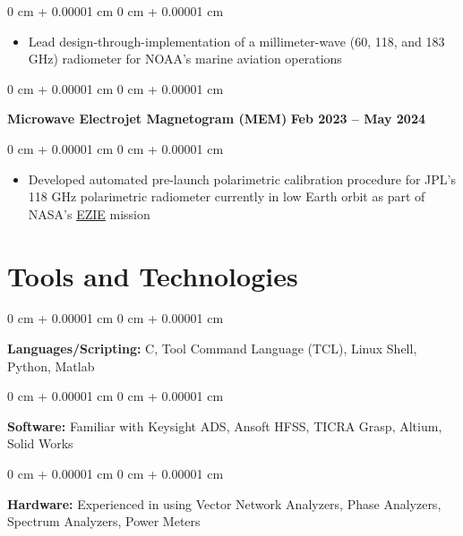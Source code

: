 \documentclass[10pt, letterpaper]{article}
\newenvironment{highlights}{
    \begin{itemize}[
        topsep=0.10 cm,
        parsep=0.10 cm,
        partopsep=0pt,
        itemsep=0pt,
        leftmargin=0 cm + 10pt     
    ]
}{
    \end{itemize}
} %
\newenvironment{onecolentry}{
    \begin{adjustwidth}{
        0 cm + 0.00001 cm
    }{
        0 cm + 0.00001 cm
    }
}{
    \end{adjustwidth}
} %
\newenvironment{twocolentry}[2][]{
    \onecolentry
    \def\secondColumn{#2}
    \setcolumnwidth{\fill, 4.5 cm}
    \begin{paracol}{2}
}{
    \switchcolumn \raggedleft \secondColumn
    \end{paracol}
    \endonecolentry
} %
\begin{document}
        \vspace{0.20 cm}
        \begin{onecolentry}
            \begin{highlights}
                \item Lead design-through-implementation  of a millimeter-wave (60, 118, and 183 GHz) radiometer for NOAA's marine aviation operations
            \end{highlights}
        \end{onecolentry}


        \vspace{0.3 cm}

        \begin{twocolentry}{
            \textbf{Feb 2023 -- May 2024}
        }
            \textbf{Microwave Electrojet Magnetogram (MEM)}\end{twocolentry}

        \vspace{0.20 cm}
        \begin{onecolentry}
            \begin{highlights}
                \item Developed automated pre-launch polarimetric calibration procedure for JPL's 118 GHz polarimetric radiometer currently in low Earth orbit as part of NASA's \href{https://science.nasa.gov/mission/ezie/}{EZIE} mission                
            \end{highlights}
        \end{onecolentry}

    \section{Tools and Technologies}        
        \begin{onecolentry}
            \textbf{Languages/Scripting:} C, Tool Command Language (TCL), Linux Shell, Python, Matlab
        \end{onecolentry}
        \vspace{0.2 cm}
        \begin{onecolentry}
            \textbf{Software:} Familiar with Keysight ADS, Ansoft HFSS, TICRA Grasp, Altium, Solid Works
        \end{onecolentry}
        \vspace{0.2 cm}
        \begin{onecolentry}
            \textbf{Hardware:}  Experienced in using Vector Network Analyzers, Phase Analyzers, Spectrum Analyzers, Power Meters
        \end{onecolentry} 
\end{document}
